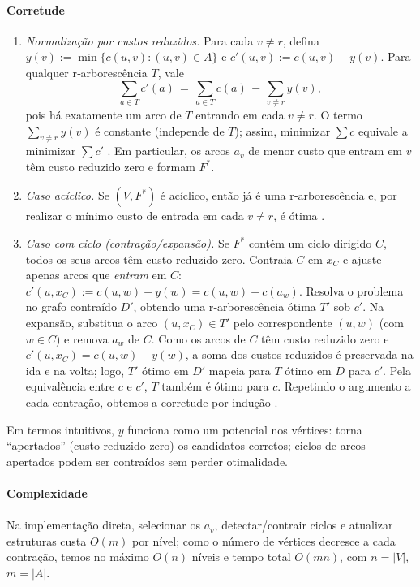 \documentclass[12pt,a4paper]{article}
\begin{document}
\paragraph{Corretude}
\begin{enumerate}\setlength{\itemsep}{2pt}
    \item \emph{Normalização por custos reduzidos.} Para cada \(v\neq r\), defina \(y(v):=\min\{c(u,v):(u,v)\in A\}\) e \(c'(u,v):=c(u,v)-y(v)\). Para qualquer r‑arborescência \(T\), vale
    \[
        \sum_{a\in T} c'(a) \,=\, \sum_{a\in T} c(a) \, - \, \sum_{v\neq r} y(v),
    \]
    pois há exatamente um arco de \(T\) entrando em cada \(v\neq r\). O termo \(\sum_{v\neq r} y(v)\) é constante (independe de \(T\)); assim, minimizar \(\sum c\) equivale a minimizar \(\sum c'\) \cite[Obs.~4.37]{kleinberg2006}. Em particular, os arcos \(a_v\) de menor custo que entram em \(v\) têm custo reduzido zero e formam \(F^*\).
    \item \emph{Caso acíclico.} Se \((V,F^*)\) é acíclico, então já é uma r‑arborescência e, por realizar o mínimo custo de entrada em cada \(v\neq r\), é ótima \cite[Obs.~4.36]{kleinberg2006}.
    \item \emph{Caso com ciclo (contração/expansão).} Se \(F^*\) contém um ciclo dirigido \(C\), todos os seus arcos têm custo reduzido zero. Contraia \(C\) em \(x_C\) e ajuste apenas arcos que \emph{entram} em \(C\): \(c'(u,x_C):=c(u,w)-y(w)=c(u,w)-c(a_w)\). Resolva o problema no grafo contraído \(D'\), obtendo uma r‑arborescência ótima \(T'\) sob \(c'\). Na expansão, substitua o arco \((u,x_C)\in T'\) pelo correspondente \((u,w)\) (com \(w\in C\)) e remova \(a_w\) de \(C\). Como os arcos de \(C\) têm custo reduzido zero e \(c'(u,x_C)=c(u,w)-y(w)\), a soma dos custos reduzidos é preservada na ida e na volta; logo, \(T'\) ótimo em \(D'\) mapeia para \(T\) ótimo em \(D\) para \(c'\). Pela equivalência entre \(c\) e \(c'\), \(T\) também é ótimo para \(c\). Repetindo o argumento a cada contração, obtemos a corretude por indução \cite[Sec.~4.9]{kleinberg2006,schrijver2003comb}.
\end{enumerate}
Em termos intuitivos, \(y\) funciona como um potencial nos vértices: torna “apertados” (custo reduzido zero) os candidatos corretos; ciclos de arcos apertados podem ser contraídos sem perder otimalidade.

\paragraph{Complexidade}
\paragraph{}
Na implementação direta, selecionar os \(a_v\), detectar/contrair ciclos e atualizar estruturas custa \(O(m)\) por nível; como o número de vértices decresce a cada contração, temos no máximo \(O(n)\) níveis e tempo total \(O(mn)\), com \(n=|V|\), \(m=|A|\).
\end{document}
